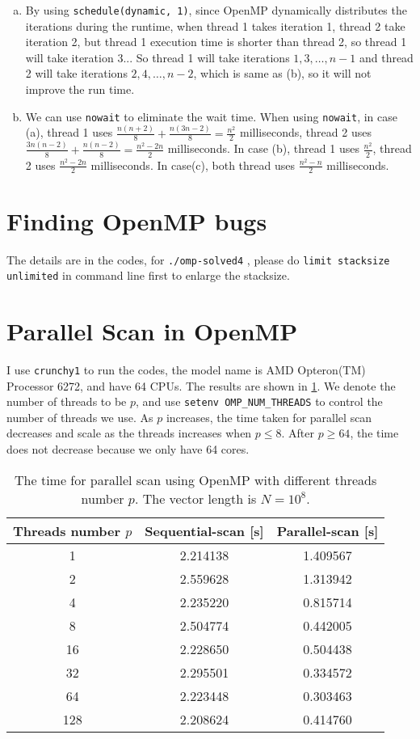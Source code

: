\documentclass[10pt,a4paper]{article}
\theoremstyle{dotlessP}
\begin{document}
\begin{enumerate}[(a)]
	\item By using \texttt{schedule(dynamic, 1)}, since OpenMP dynamically distributes the iterations during the runtime, when thread 1 takes iteration 1, thread 2 take iteration 2, but thread 1 execution time is shorter than thread 2, so thread 1 will take iteration 3... So thread 1 will take iterations $1, 3, \ldots, n-1$ and thread 2 will take iterations $2, 4, \ldots, n-2$, which is same as (b), so it will not improve the run time.
	
	\item We can use \texttt{nowait} to eliminate the wait time. When using \texttt{nowait}, in case (a), thread 1 uses $\frac{n(n+2)}{8}+\frac{n(3n-2)}{8}=\frac{n^2}{2}$ milliseconds, thread 2 uses $\frac{3n(n-2)}{8}+\frac{n(n-2)}{8}=\frac{n^2-2n}{2}$ milliseconds. In case (b), thread 1 uses $\frac{n^2}{2}$, thread 2 uses $\frac{n^2-2n}{2}$ milliseconds. In case(c), both thread uses $\frac{n^2-n}{2}$ milliseconds.
	
\end{enumerate}

\section{Finding OpenMP bugs}
The details are in the codes, for \texttt{./omp-solved4} , please do \texttt{limit stacksize unlimited} in command line first to enlarge the stacksize.

\section{Parallel Scan in OpenMP}
I use \texttt{crunchy1} to run the codes, the model name is AMD Opteron(TM) Processor 6272, and have 64 CPUs. The results are shown in \cref{tab:scan}. We denote the number of threads to be $p$, and use \texttt{setenv OMP\_NUM\_THREADS} to control the number of threads we use. As $p$ increases, the time taken for parallel scan decreases and scale as the threads increases when $p\leq 8$.
After $p\geq 64$, the time does not decrease because we only have 64 cores.

\begin{table}[tbhp]
	\label{tab:scan}
	\caption{The time for parallel scan using OpenMP with different threads number $p$. The vector length is $N=10^8.$}
		\centering
	\begin{tabular}{c|c|c}
		\hline 
Threads number $p$	& Sequential-scan [s]  &  Parallel-scan [s]\\ 
		\hline 
	1	& 2.214138 & 1.409567 \\ 
	2	& 2.559628& 1.313942 \\ 
	4	& 2.235220&  0.815714\\ 
	8 & 2.504774 & 0.442005\\
	16 & 2.228650 & 0.504438 \\
	32 & 2.295501 & 0.334572 \\
	64 & 2.223448 & 0.303463 \\
	128 & 2.208624 & 0.414760 \\
		\hline 
	\end{tabular} 
\end{table}
\end{document}
